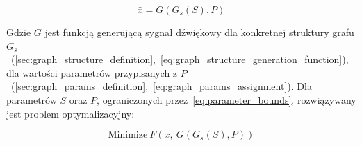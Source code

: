 \begin{equation}
  \bar{x} = G(G_s(S), P)
  \label{eq:graph_generated_signal}
\end{equation}

\noindent
Gdzie $G$ jest funkcją generującą sygnał dźwiękowy dla konkretnej struktury grafu
$G_s$~(\ref{sec:graph_structure_definition},~\ref{eq:graph_structure_generation_function}),
dla wartości parametrów przypisanych z
$P$~(\ref{sec:graph_params_definition},~\ref{eq:graph_params_assignment}).
Dla parametrów $S$ oraz $P$, ograniczonych przez~\ref{eq:parameter_bounds},
rozwiązywany jest problem optymalizacyjny:

\begin{equation}
  \text{Minimize}~F(x,~G(G_s(S), P))
  \label{eq:target_function}
\end{equation}

